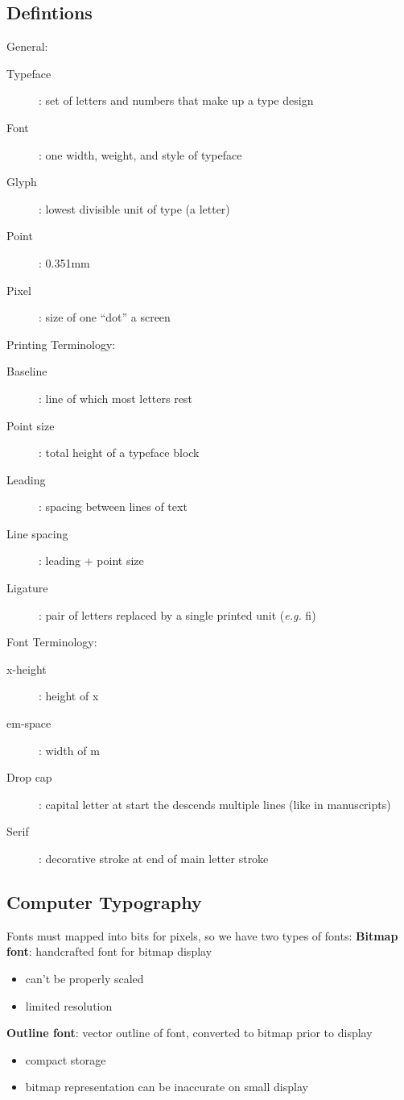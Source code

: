 \documentclass[]{article}
\theoremstyle{definition}
\begin{document}
	\subsection{Defintions}
	General:
	\begin{description}
		\item[Typeface]: set of letters and numbers that make up a type design
		\item[Font]: one width, weight, and style of typeface
		\item[Glyph]: lowest divisible unit of type (a letter)
		\item[Point]: 0.351mm
		\item[Pixel]: size of one ``dot'' a screen
	\end{description}
	Printing Terminology:
	\begin{description}
		\item[Baseline]: line of which most letters rest
		\item[Point size]: total height of a typeface block
		\item[Leading]: spacing between lines of text
		\item[Line spacing]: leading + point size
		\item[Ligature]: pair of letters replaced by a single printed unit (\textit{e.g.} fi)
	\end{description}
	Font Terminology:
	\begin{description}
		\item[x-height]: height of x
		\item[em-space]: width of m
		\item[Drop cap]: capital letter at start the descends multiple lines (like in manuscripts)
		\item[Serif]: decorative stroke at end of main letter stroke
	\end{description}

	\subsection{Computer Typography}
	Fonts must mapped into bits for pixels, so we have two types of fonts:
	\textbf{Bitmap font}: handcrafted font for bitmap display
	\begin{itemize}
		\item can't be properly scaled
		\item limited resolution
	\end{itemize}

	\textbf{Outline font}: vector outline of font, converted to bitmap prior to display
	\begin{itemize}
		\item compact storage
		\item bitmap representation can be inaccurate on small display
	\end{itemize}
\end{document}
